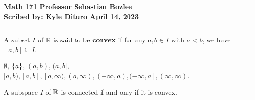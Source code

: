 \documentclass[12pt, twosided]{article}
\begin{document}
\noindent \textbf{Math 171} \hfill \textbf{Professor Sebastian Bozlee} \\
\textbf{Scribed by: Kyle Dituro} \hfill \textbf{April 14, 2023}\hrule
\vspace{.2in}

\begin{df}
  A subset \(I\) of \(\mathbb{R}\) is said to be \textbf{convex} if for any \(a, b \in I\) with \(a < b\), we have \([a,b] \subseteq I\).
\end{df}
\begin{exa}
  \(\emptyset\), \(\left\{ a \right\}\), \((a,b)\), \((a, b]\), \([a,b), [a,b], [a, \infty), (a, \infty), (-\infty, a), (-\infty, a], (\infty, \infty)\).
\end{exa}

\begin{thm}
  A subspace \(I\) of \(\mathbb{R}\) is connected if and only if it is convex.
\end{thm}
\end{document}
